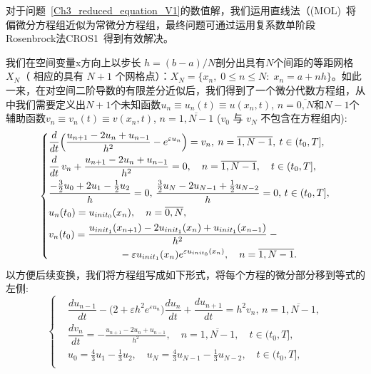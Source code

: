 \documentclass[twoside]{book}
\begin{document}
\begin{CJK*}{GBK}{song}
    对于问题~\eqref{Ch3_reduced_equation_V1}的数值解，我们运用直线法（(MOL)~\cite{Kalitkin&Ko_1,Kalitkin,Hairer&Wanner}将偏微分方程组近似为常微分方程组，最终问题可通过运用复系数单阶段Rosenbrock法CROS1~\cite{Kalitkin&Ko_1,Rosenbrock}得到有效解决。

    我们在空间变量x方向上以步长 $h = (b - a)/N$剖分出具有$N$个间距的等距网格$X_N$（	相应的具有 $N + 1$ 个网格点）：$X_N = \{x_n, \; 0 \leqslant n \leqslant N: \; x_n = a + n h\}$。如此一来，在对空间二阶导数的有限差分近似后，我们得到了一个微分代数方程组，从中我们需要定义出$N + 1$个未知函数$u_{n} \equiv  u_{n}(t) \equiv u(x_n,t)$, $n = \overline{0,N}$和$N - 1$个辅助函数$v_{n} \equiv  v_{n}(t) \equiv v(x_n,t)$, $n = \overline{1,N - 1}$ ($v_0$ 与 $v_N$ 不包含在方程组内):
	\begin{equation*}
	\left\{
	\begin{aligned}
	&\dfrac{d}{d t} \Big(\dfrac{u_{n + 1} - 2u_n + u_{n - 1}}{h^2} - e^{\varepsilon u_n}\Big) = v_n, \: n = \overline{1,N - 1}, \: t \in (t_0,T], \\
	&\dfrac{d}{d t} \, v_n + \dfrac{u_{n + 1} - 2u_n + u_{n - 1}}{h^2} = 0, \quad n = \overline{1,N - 1}, \quad t \in (t_0,T], \\
	&\frac{-\frac{3}{2}u_0 + 2u_1 - \frac{1}{2}u_2}{h} = 0, \, \frac{\frac{3}{2}u_N - 2u_{N - 1} + \frac{1}{2}u_{N - 2}}{h} = 0, \, t \in (t_0,T],\\
	&u_n(t_0) = u_{init_0}(x_n), \quad n = \overline{0,N},\\
	&v_n(t_0) = \frac{u_{init_1}(x_{n + 1}) - 2u_{init_1}(x_n) + u_{init_1}(x_{n - 1})}{h^2} - {}\\
	&\hspace{2.5cm} - \varepsilon u_{init_1}(x_n) e^{\varepsilon u_{init_0}(x_n)}, \quad n = \overline{1,N - 1}.
	\end{aligned}
	\right.
	\end{equation*}
    以方便后续变换，我们将方程组写成如下形式，将每个方程的微分部分移到等式的左侧:
	\begin{equation*}
	\left\{
	\begin{aligned}
	&\dfrac{d u_{n - 1}}{d t} - \big(2 + \varepsilon h^2 e^{\varepsilon u_n}\big)\dfrac{d u_n}{d t} + \dfrac{d u_{n + 1}}{d t} = h^2 v_n, \, n = \overline{1,N - 1}, \\ %
	&\dfrac{d v_n}{dt} = -\frac{u_{n + 1} - 2u_n + u_{n - 1}}{h^2}, \quad n = \overline{1,N - 1}, \quad t \in (t_0,T], \\
	&u_0 = \frac{4}{3}u_1 - \frac{1}{3}u_2, \quad u_N = \frac{4}{3}u_{N - 1} - \frac{1}{3}u_{N - 2}, \quad t \in (t_0,T],\\

\end{aligned}
\end{equation*}
\end{CJK*}
\end{document}
